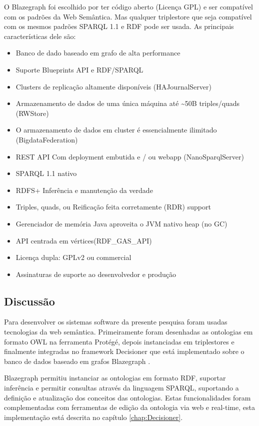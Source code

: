 O Blazegraph foi escolhido por ter código aberto (Licença GPL) e ser
compatível com os padrões da Web Semântica. Mas qualquer \foreignlanguage{english}{triplestore}
que seja compatível com os mesmos padrões SPARQL 1.1 e RDF pode ser
usada. As principais características dele são:
\begin{itemize}
\item Banco de dado baseado em grafo de alta performance
\item Suporte Blueprints API e RDF/SPARQL
\item Clusters de replicação altamente disponíveis (HAJournalServer) 
\item Armazenamento de dados de uma única máquina até \textasciitilde{}50B
triples/quads (RWStore) 
\item O armazenamento de dados em cluster é essencialmente ilimitado (BigdataFederation) 
\item REST API Com deployment embutida e / ou webapp (NanoSparqlServer) 
\item SPARQL 1.1 nativo 
\item RDFS+ Inferência e manutenção da verdade
\item Triples, quads, ou Reificação feita corretamente (RDR) support 
\item Gerenciador de memória Java aproveita o JVM nativo heap (no GC) 
\item API centrada em vértices(RDF\_GAS\_API) 
\item Licença dupla: GPLv2 ou commercial 
\item Assinaturas de suporte ao desenvolvedor e produção
\end{itemize}

\subsection*{Discussão }

Para desenvolver os sistemas software da presente pesquisa foram usadas
tecnologias da web semântica. Primeiramente foram desenhadas as ontologias
em formato \foreignlanguage{english}{OWL} na ferramenta Protégé, depois
instanciadas em \foreignlanguage{english}{triplestores} e finalmente
integradas no framework Decisioner que está implementado sobre o banco
de dados baseado em grafos \foreignlanguage{english}{Blazegraph} .

%
Blazegraph\foreignlanguage{brazil}{ permitiu instanciar as ontologias
em formato }RDF,\foreignlanguage{brazil}{ suportar inferência e permitir
consultas através da linguagem }SPARQL,\foreignlanguage{brazil}{ suportando
a definição e atualização dos conceitos das ontologias. Estas funcionalidades
foram complementadas com ferramentas de edição da ontologia via web
e }real-time\foreignlanguage{brazil}{, esta implementação está descrita
no capítulo \ref{chap:Decisioner}. }

